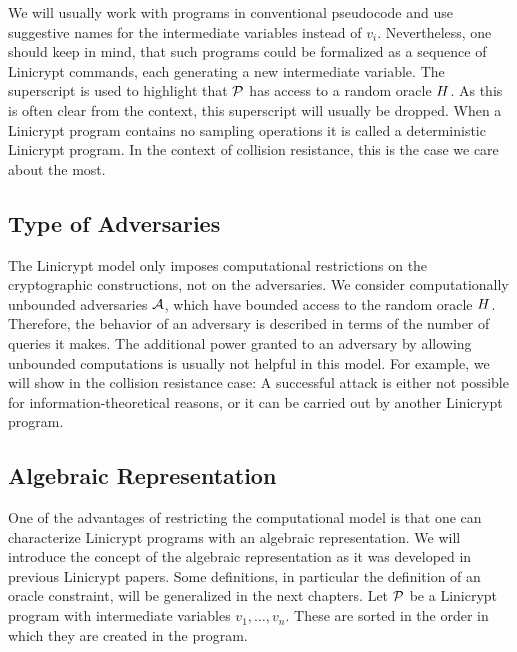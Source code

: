 We will usually work with programs in conventional pseudocode and use suggestive names for the intermediate variables instead of $v_i$.
Nevertheless, one should keep in mind,
that such programs could be formalized as a sequence of Linicrypt commands,
each generating a new intermediate variable.
The superscript is used to highlight that $\P$ has access to a random oracle $\H$.
As this is often clear from the context, this superscript will usually be dropped.
When a Linicrypt program contains no sampling operations it is called a deterministic Linicrypt program. 
In the context of collision resistance, this is the case we care about the most.

\subsection{Type of Adversaries}
The Linicrypt model only imposes computational restrictions on the cryptographic constructions,
not on the adversaries.
We consider computationally unbounded adversaries $\A$,
which have bounded access to the random oracle $\H$.
Therefore, the behavior of an adversary is described in terms of the number of queries it makes.
The additional power granted to an adversary by allowing unbounded computations is usually not helpful in this model.
For example, we will show in the collision resistance case:
A successful attack is either not possible for information-theoretical reasons,
or it can be carried out by another Linicrypt program.

\subsection{Algebraic Representation}

One of the advantages of restricting the computational model is that one can characterize
Linicrypt programs with an algebraic representation.
We will introduce the concept of the algebraic representation as it was developed in previous Linicrypt papers.
Some definitions, in particular the definition of an oracle constraint, will be generalized in the next chapters.
Let $\P$ be a Linicrypt program with intermediate variables $v_1, \dots, v_n$.
These are sorted in the order in which they are created in the program.

